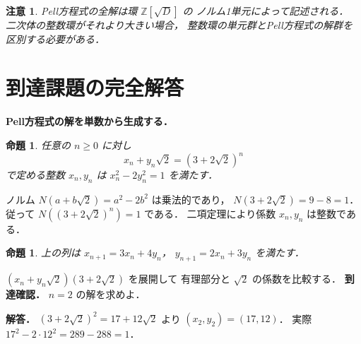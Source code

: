 \documentclass[a5paper,10pt,onecolumn]{jsarticle}
\makeatletter
\theoremstyle{mathnotetheorem}
\newtheorem{proposition}[theorem]{命題}
\newtheorem{remark}[theorem]{注意}
\renewcommand{\proofname}{証明}
\renewenvironment{proof}[1][\proofname]{%
  \par\pushQED{\qed}\normalfont\topsep4\p@\@plus2\p@\relax
  \trivlist\item[\hskip\labelsep\bfseries #1]\ignorespaces
}{\popQED\endtrivlist\@endpefalse}
\makeatother
\begin{document}
\begin{remark}
Pell方程式の全解は環 $\mathbb Z[\sqrt D]$ の
ノルム1単元によって記述される．
二次体の整数環がそれより大きい場合，
整数環の単元群とPell方程式の解群を
区別する必要がある．
\end{remark}

\section{到達課題の完全解答}
\noindent\textbf{Pell方程式の解を単数から生成する．}
\begin{proposition}
任意の $n\ge0$ に対し
\[
x_n+y_n\sqrt2=(3+2\sqrt2)^n
\]
で定める整数 $x_n,y_n$ は
$x_n^2-2y_n^2=1$ を満たす．
\end{proposition}
\begin{proof}
ノルム
$N(a+b\sqrt2)=a^2-2b^2$ は乗法的であり，
$N(3+2\sqrt2)=9-8=1$．
従って $N((3+2\sqrt2)^n)=1$ である．
二項定理により係数 $x_n,y_n$ は整数である．
\end{proof}
\begin{proposition}
上の列は
$x_{n+1}=3x_n+4y_n$，
$y_{n+1}=2x_n+3y_n$ を満たす．
\end{proposition}
\begin{proof}
$(x_n+y_n\sqrt2)(3+2\sqrt2)$ を展開して
有理部分と $\sqrt2$ の係数を比較する．
\end{proof}
\noindent\textbf{到達確認．}
$n=2$ の解を求めよ．
\par\noindent\textbf{解答．}
$(3+2\sqrt2)^2=17+12\sqrt2$ より
$(x_2,y_2)=(17,12)$．
実際 $17^2-2\cdot12^2=289-288=1$．
\end{document}
